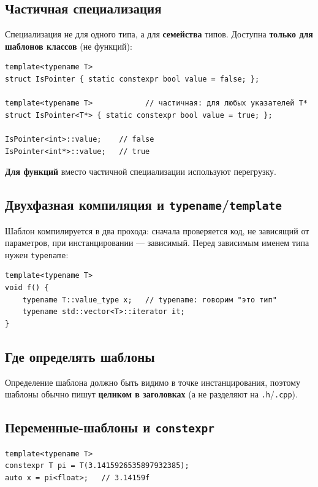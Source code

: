 \subsection{Частичная специализация}

Специализация не для одного типа, а для \textbf{семейства} типов. Доступна
\textbf{только для шаблонов классов} (не функций):

\begin{lstlisting}
template<typename T>
struct IsPointer { static constexpr bool value = false; };

template<typename T>            // частичная: для любых указателей T*
struct IsPointer<T*> { static constexpr bool value = true; };

IsPointer<int>::value;    // false
IsPointer<int*>::value;   // true
\end{lstlisting}

\textbf{Для функций} вместо частичной специализации используют перегрузку.

\subsection{Двухфазная компиляция и \texttt{typename}/\texttt{template}}

Шаблон компилируется в два прохода: сначала проверяется код, не зависящий от
параметров, при инстанцировании --- зависимый. Перед зависимым именем типа нужен
\texttt{typename}:

\begin{lstlisting}
template<typename T>
void f() {
    typename T::value_type x;   // typename: говорим "это тип"
    typename std::vector<T>::iterator it;
}
\end{lstlisting}

\subsection{Где определять шаблоны}

Определение шаблона должно быть видимо в точке инстанцирования, поэтому шаблоны
обычно пишут \textbf{целиком в заголовках} (а не разделяют на \texttt{.h}/\texttt{.cpp}).

\subsection{Переменные-шаблоны и \texttt{constexpr}}

\begin{lstlisting}
template<typename T>
constexpr T pi = T(3.1415926535897932385);
auto x = pi<float>;   // 3.14159f
\end{lstlisting}

